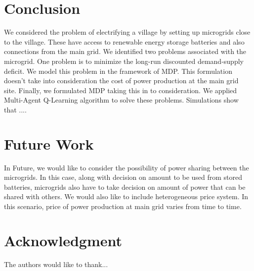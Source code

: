 \documentclass[conference]{IEEEtran}
\begin{document}
\section{Conclusion}
We considered the problem of electrifying a village by setting up microgrids close to the village. These have access to renewable energy storage batteries and also connections from the main grid. We identified two problems associated with the microgrid. One problem is to minimize the long-run discounted demand-supply deficit. We model this problem in the framework of MDP. This formulation doesn't take into consideration the cost of power production at the main grid site. Finally, we formulated MDP taking this in to consideration. We applied Multi-Agent Q-Learning algorithm to solve these problems. Simulations show that ....

\section{Future Work}
In Future, we would like to consider the possibility of power sharing between the microgrids. In this case, along with decision on amount to be used from stored batteries, microgrids also have to take decision on amount of power that can be shared with others. We would also like to include heterogeneous price system. In this scenario, price of power production at main grid varies from time to time.







\section*{Acknowledgment}


The authors would like to thank...


 
 




\end{document}
